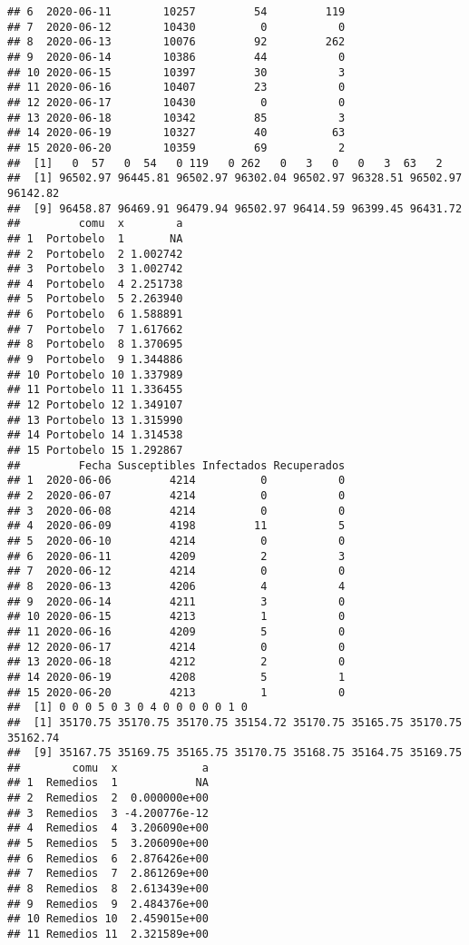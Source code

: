 \documentclass[
]{article}
\begin{document}
\begin{verbatim}
## 6  2020-06-11        10257         54         119
## 7  2020-06-12        10430          0           0
## 8  2020-06-13        10076         92         262
## 9  2020-06-14        10386         44           0
## 10 2020-06-15        10397         30           3
## 11 2020-06-16        10407         23           0
## 12 2020-06-17        10430          0           0
## 13 2020-06-18        10342         85           3
## 14 2020-06-19        10327         40          63
## 15 2020-06-20        10359         69           2
##  [1]   0  57   0  54   0 119   0 262   0   3   0   0   3  63   2
##  [1] 96502.97 96445.81 96502.97 96302.04 96502.97 96328.51 96502.97 96142.82
##  [9] 96458.87 96469.91 96479.94 96502.97 96414.59 96399.45 96431.72
##         comu  x        a
## 1  Portobelo  1       NA
## 2  Portobelo  2 1.002742
## 3  Portobelo  3 1.002742
## 4  Portobelo  4 2.251738
## 5  Portobelo  5 2.263940
## 6  Portobelo  6 1.588891
## 7  Portobelo  7 1.617662
## 8  Portobelo  8 1.370695
## 9  Portobelo  9 1.344886
## 10 Portobelo 10 1.337989
## 11 Portobelo 11 1.336455
## 12 Portobelo 12 1.349107
## 13 Portobelo 13 1.315990
## 14 Portobelo 14 1.314538
## 15 Portobelo 15 1.292867
##         Fecha Susceptibles Infectados Recuperados
## 1  2020-06-06         4214          0           0
## 2  2020-06-07         4214          0           0
## 3  2020-06-08         4214          0           0
## 4  2020-06-09         4198         11           5
## 5  2020-06-10         4214          0           0
## 6  2020-06-11         4209          2           3
## 7  2020-06-12         4214          0           0
## 8  2020-06-13         4206          4           4
## 9  2020-06-14         4211          3           0
## 10 2020-06-15         4213          1           0
## 11 2020-06-16         4209          5           0
## 12 2020-06-17         4214          0           0
## 13 2020-06-18         4212          2           0
## 14 2020-06-19         4208          5           1
## 15 2020-06-20         4213          1           0
##  [1] 0 0 0 5 0 3 0 4 0 0 0 0 0 1 0
##  [1] 35170.75 35170.75 35170.75 35154.72 35170.75 35165.75 35170.75 35162.74
##  [9] 35167.75 35169.75 35165.75 35170.75 35168.75 35164.75 35169.75
##        comu  x             a
## 1  Remedios  1            NA
## 2  Remedios  2  0.000000e+00
## 3  Remedios  3 -4.200776e-12
## 4  Remedios  4  3.206090e+00
## 5  Remedios  5  3.206090e+00
## 6  Remedios  6  2.876426e+00
## 7  Remedios  7  2.861269e+00
## 8  Remedios  8  2.613439e+00
## 9  Remedios  9  2.484376e+00
## 10 Remedios 10  2.459015e+00
## 11 Remedios 11  2.321589e+00

\end{verbatim}
\end{document}
